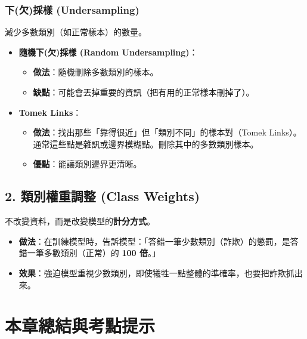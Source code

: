 \documentclass[
  letterpaper,
  DIV=11,
  numbers=noendperiod]{scrreprt}
\providecommand{\tightlist}{%
  \setlength{\itemsep}{0pt}\setlength{\parskip}{0pt}}
\begin{document}
\subsection{下(欠)採樣
(Undersampling)}\label{ux4e0bux6b20ux63a1ux6a23-undersampling}

減少多數類別（如正常樣本）的數量。

\begin{itemize}
\tightlist
\item
  \textbf{隨機下(欠)採樣 (Random Undersampling)}：

  \begin{itemize}
  \tightlist
  \item
    \textbf{做法}：隨機刪除多數類別的樣本。
  \item
    \textbf{缺點}：可能會丟掉重要的資訊（把有用的正常樣本刪掉了）。
  \end{itemize}
\item
  \textbf{Tomek Links}：

  \begin{itemize}
  \tightlist
  \item
    \textbf{做法}：找出那些「靠得很近」但「類別不同」的樣本對（Tomek
    Links）。通常這些點是雜訊或邊界模糊點。刪除其中的多數類別樣本。
  \item
    \textbf{優點}：能讓類別邊界更清晰。
  \end{itemize}
\end{itemize}

\section{2. 類別權重調整 (Class
Weights)}\label{ux985eux5225ux6b0aux91cdux8abfux6574-class-weights}

不改變資料，而是改變模型的\textbf{計分方式}。

\begin{itemize}
\tightlist
\item
  \textbf{做法}：在訓練模型時，告訴模型：「答錯一筆少數類別（詐欺）的懲罰，是答錯一筆多數類別（正常）的
  \textbf{100 倍}。」
\item
  \textbf{效果}：強迫模型重視少數類別，即使犧牲一點整體的準確率，也要把詐欺抓出來。
\end{itemize}

\chapter{本章總結與考點提示}\label{chap-chapter4-summary}
\end{document}
